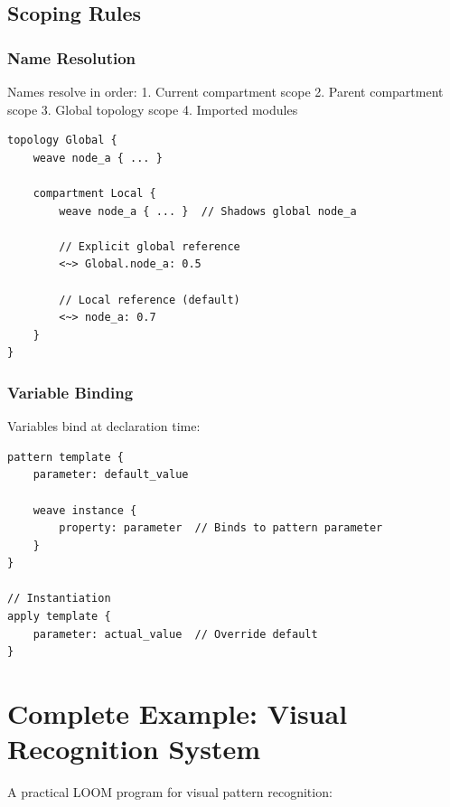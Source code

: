\documentclass[12pt,a4paper,openany]{book} %
\begin{document}
\subsection{Scoping Rules}

\subsubsection{Name Resolution}

Names resolve in order:
1. Current compartment scope
2. Parent compartment scope
3. Global topology scope
4. Imported modules

\vspace{0.5em}
\begin{lstlisting}[language=loom]
topology Global {
    weave node_a { ... }

    compartment Local {
        weave node_a { ... }  // Shadows global node_a

        // Explicit global reference
        <~> Global.node_a: 0.5

        // Local reference (default)
        <~> node_a: 0.7
    }
}
\end{lstlisting}
\vspace{0.5em}

\subsubsection{Variable Binding}

Variables bind at declaration time:

\vspace{0.5em}
\begin{lstlisting}[language=loom]
pattern template {
    parameter: default_value

    weave instance {
        property: parameter  // Binds to pattern parameter
    }
}

// Instantiation
apply template {
    parameter: actual_value  // Override default
}
\end{lstlisting}
\vspace{0.5em}

\section{Complete Example: Visual Recognition System}

A practical LOOM program for visual pattern recognition:
\end{document}
